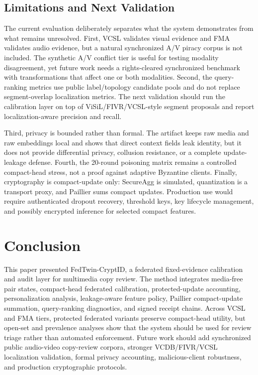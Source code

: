 \documentclass[journal]{IEEEtran}
\newcommand{\ours}{FedTwin-CryptID}
\begin{document}
\subsection{Limitations and Next Validation}

The current evaluation deliberately separates what the system demonstrates from what remains unresolved. First, VCSL validates visual evidence and FMA validates audio evidence, but a natural synchronized A/V piracy corpus is not included. The synthetic A/V conflict tier is useful for testing modality disagreement, yet future work needs a rights-cleared synchronized benchmark with transformations that affect one or both modalities. Second, the query-ranking metrics use public label/topology candidate pools and do not replace segment-overlap localization metrics. The next validation should run the calibration layer on top of ViSiL/FIVR/VCSL-style segment proposals and report localization-aware precision and recall.

Third, privacy is bounded rather than formal. The artifact keeps raw media and raw embeddings local and shows that direct context fields leak identity, but it does not provide differential privacy, collusion resistance, or a complete update-leakage defense. Fourth, the 20-round poisoning matrix remains a controlled compact-head stress, not a proof against adaptive Byzantine clients. Finally, cryptography is compact-update only: SecureAgg is simulated, quantization is a transport proxy, and Paillier sums compact updates. Production use would require authenticated dropout recovery, threshold keys, key lifecycle management, and possibly encrypted inference for selected compact features.

\section{Conclusion}

This paper presented \ours, a federated fixed-evidence calibration and audit layer for multimedia copy review. The method integrates media-free pair states, compact-head federated calibration, protected-update accounting, personalization analysis, leakage-aware feature policy, Paillier compact-update summation, query-ranking diagnostics, and signed receipt chains. Across VCSL and FMA tiers, protected federated variants preserve compact-head utility, but open-set and prevalence analyses show that the system should be used for review triage rather than automated enforcement. Future work should add synchronized public audio-video copy-review corpora, stronger VCDB/FIVR/VCSL localization validation, formal privacy accounting, malicious-client robustness, and production cryptographic protocols.
\end{document}
